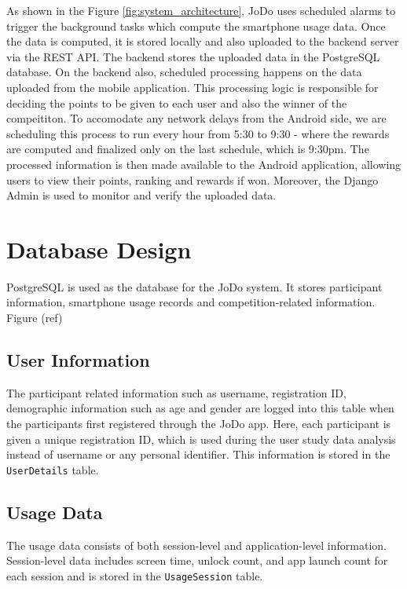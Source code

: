 \documentclass[11pt]{report}
\begin{document}
As shown in the Figure \ref{fig:system_architecture}, JoDo uses scheduled alarms to trigger the background tasks which compute the 
smartphone usage data. Once the data is computed, it is stored locally and also uploaded to the backend server via the REST API.
The backend stores the uploaded data in the PostgreSQL database. 
On the backend also, scheduled processing happens on the data uploaded from the mobile application. 
This processing logic is responsible for deciding the points to be given to each user and also the winner of the compeititon. 
To accomodate any network delays from the Android side, we are scheduling this process to run every hour from 5:30 to 9:30 - 
where the rewards are computed and finalized only on the last schedule, which is 9:30pm.
The processed information is then made available to the Android application, allowing users to view their 
points, ranking and rewards if won. Moreover, the Django Admin is used to monitor and verify the uploaded data.

\section{Database Design}

PostgreSQL is used as the database for the JoDo system. It stores participant information, 
smartphone usage records and competition-related information. Figure (ref)

\subsection{User Information}
The participant related information such as username, registration ID, demographic information such as age 
and gender are logged into this table when the participants first registered through the JoDo app. Here, each 
participant is given a unique registration ID, which is used during the user study data analysis instead of 
username or any personal identifier. This information is stored in the \texttt{UserDetails} table.

\subsection{Usage Data}

The usage data consists of both session-level and application-level information. 
Session-level data includes screen time, unlock count, and app launch count for each 
session and is stored in the \texttt{UsageSession} table.
\end{document}
